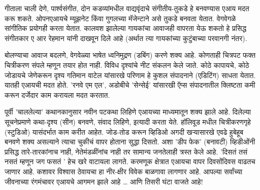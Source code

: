 गीताला चाली देणे, पार्श्वसंगीत, दोन कडव्यांमधील वाद्यवृंदाचे संगीतीय-तुकडे हे बनवण्यास एआय मदत करू शकते. ओपनएआयचे म्यूझनेट किंवा गुगलच्या मॅजेन्टाने असे तुकडे बनवता येतात. वेगवेगळे सांगीतिक प्रयोगही करता येतात. कालवश झालेल्या गायकांचा आवाजही वापरता येऊ शकतो हे प्रसिद्ध संगीतकार ए आर रेहमान यांनी दाखवून दिले आहे (अर्थात त्या गायकांच्या कुटुंबाच्या परवानगी नंतर).

बोलण्याचा आवाज बदलणे, वेगवेळ्या भाषेत ध्वनिमुद्रण (डबिंग) करणे शक्य आहे. कोणताही चित्रपट फक्त चित्रीकरण संपले म्हणून तयार होत नाही. विविध दृश्यांचे नीट संकलन केले जाते. कोठे कापायचे, कोठे जोडायचे जेणेकरून दृश्य गतिमान वाटेल यांसारखे परिणाम हे कुशल संपादनाने (एडिटिंग) साधता येतात. यातही एआयची मदत होते. 'रनवे एम एल', अडोबीचे 'सेन्सेई' यांसारखी ऍप्स संपादनातील क्लिष्टता कमी करून दर्जेदार काम करायला मदत करतात.

पूर्वी 'चाललेल्या' कथानकानुसार नवीन पटकथा लिहिणे एआयच्या माध्यमातून शक्य झाले आहे. दिलेल्या सूचनेप्रमाणे कथा-दृश्य (सीन) बनवणे, संवाद लिहिणे, इत्यादी करता येते. हॉलिवूड मधील चित्रीकरणगृहे (स्टुडिओ) यासंदर्भात काम करीत आहेत. जोड-तोड करून व्हिडिओ अगदी खऱ्यासारखे एवढे हुबेहूब बनवणे शक्य असल्याने त्याचा चुकीचं वापर होताना सुद्धा दिसतो. अशा 'डीप फेक' (बनावटी) व्हिडीओंनी प्रसिद्ध तारे-तारकांनाच नाही, नेतेमंडळींनांच नाही तर सामान्य जनतेलाही त्रस्त केले आहे. 'दिसतं तसं नसतं म्हणून जग फसतं ' हेच खरे वाटायला लागते. करमणूक क्षेत्रात एआयचा वापर दिवसोंदिवस वाढतच जाणार आहे. कशावर विश्वास ठेवायचा हा नीर-क्षीर विवेक बाळगावा लागणार आहे. आपल्या सर्वांच्या जीवनाच्या रंगमंचावर एआयचे आगमन झाले आहे … आणि तिसरी घंटा वाजते आहे!